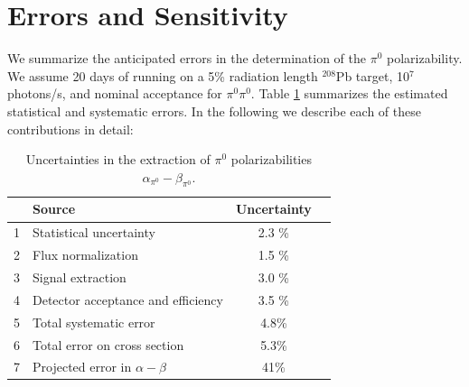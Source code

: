 \section{Errors and Sensitivity}
We summarize the anticipated errors in the determination of the $\pi^0$ polarizability. We assume 
20 days of running on a 5\% radiation length $^{208}$Pb target, 10$^7$ photons/s, and nominal acceptance for $\pi^0 \pi^0$.
Table \ref{errors} summarizes the estimated statistical and systematic errors. In the following we describe each of
these contributions in detail: 

\begin{table}[bt]
\caption{Uncertainties in the extraction of $\pi^0$ polarizabilities $\alpha_{\pi^0}-\beta_{\pi^0}$.
\label{errors}
}
\begin{center}
\begin{tabular}{|l|l|c|c|}
\hline
\hline
  &  Source  & Uncertainty   \\  \hline \hline
  1 & Statistical uncertainty  &  2.3 \%    \\ \hline
  2 & Flux normalization &  1.5 \%     \\ \hline
  3 & Signal extraction  & 3.0 \%  \\ \hline
  4 & Detector acceptance and efficiency &  3.5 \%   \\ \hline
  5 & Total systematic error  &  4.8\% \\ \hline
  6 & Total error on cross section  &  5.3\% \\ \hline
  7 & Projected error in $\alpha - \beta$ &  41\%  \\ 
 \hline
 \hline
\end{tabular}
\end{center}
\end{table}


